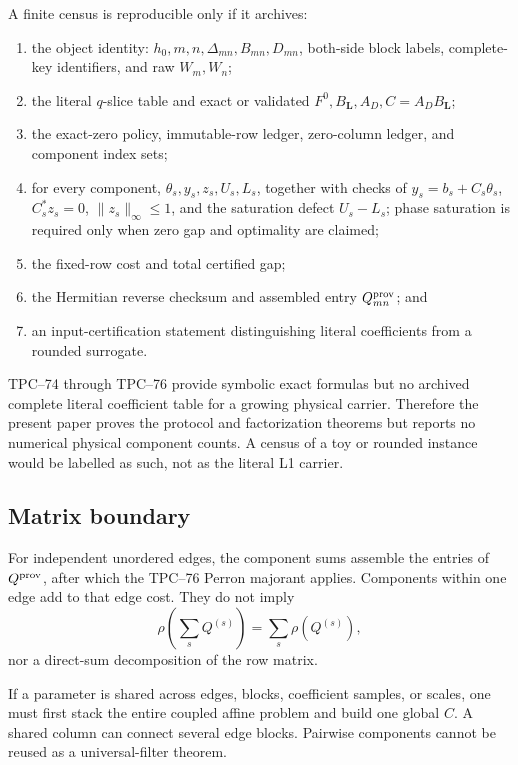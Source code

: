 A finite census is reproducible only if it archives:
\begin{enumerate}[label=\textup{(C\arabic*)},leftmargin=3.4em]
 \item the object identity: \(h_0,m,n,\Delta_{mn},B_{mn},D_{mn}\),
       both-side block labels, complete-key identifiers, and raw
       \(W_m,W_n\);
 \item the literal \(q\)-slice table and exact or validated
       \(F^0,B_{\boldsymbol L},A_D,C=A_DB_{\boldsymbol L}\);
 \item the exact-zero policy, immutable-row ledger, zero-column ledger,
       and component index sets;
 \item for every component,
       \(\theta_s,y_s,z_s,U_s,L_s\), together with checks of
       \(y_s=b_s+C_s\theta_s\),
       \(C_s^*z_s=0\), \(\|z_s\|_\infty\le1\), and the saturation defect
       \(U_s-L_s\); phase saturation is required only when zero gap and
       optimality are claimed;
 \item the fixed-row cost and total certified gap;
 \item the Hermitian reverse checksum and assembled entry
       \(Q^{\rm prov}_{mn}\); and
 \item an input-certification statement distinguishing literal
       coefficients from a rounded surrogate.
\end{enumerate}

\begin{remark}
TPC--74 through TPC--76 provide symbolic exact formulas but no archived
complete literal coefficient table for a growing physical carrier.
Therefore the present paper proves the protocol and factorization
theorems but reports no numerical physical component counts. A census
of a toy or rounded instance would be labelled as such, not as the
literal L1 carrier.
\end{remark}

\subsection{Matrix boundary}

For independent unordered edges, the component sums assemble the
entries of \(Q^{\rm prov}\), after which the TPC--76 Perron majorant
applies. Components within one edge add to that edge cost. They do not
imply
\[
 \rho\!\left(\sum_sQ^{(s)}\right)
 =
 \sum_s\rho(Q^{(s)}),
\]
nor a direct-sum decomposition of the row matrix.

If a parameter is shared across edges, blocks, coefficient samples, or
scales, one must first stack the entire coupled affine problem and build
one global \(C\). A shared column can connect several edge blocks.
Pairwise components cannot be reused as a universal-filter theorem.
